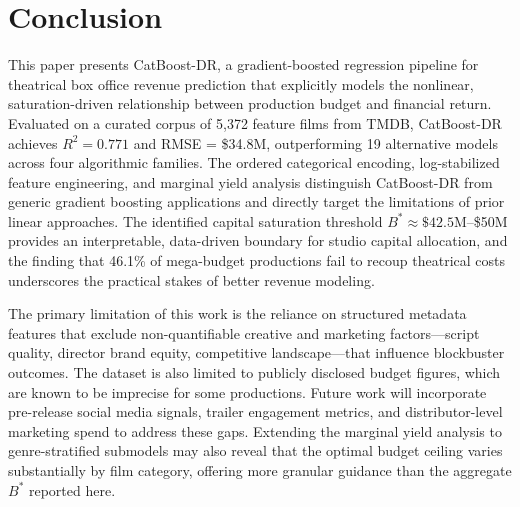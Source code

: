 \documentclass[journal]{IEEEtran}
\begin{document}
\section{Conclusion}
\label{sec:conclusion}

This paper presents CatBoost-DR, a gradient-boosted regression pipeline for theatrical box office revenue prediction that explicitly models the nonlinear, saturation-driven relationship between production budget and financial return. Evaluated on a curated corpus of 5,372 feature films from TMDB, CatBoost-DR achieves \(R^2 = 0.771\) and RMSE = \$34.8M, outperforming 19 alternative models across four algorithmic families. The ordered categorical encoding, log-stabilized feature engineering, and marginal yield analysis distinguish CatBoost-DR from generic gradient boosting applications and directly target the limitations of prior linear approaches. The identified capital saturation threshold \(B^* \approx \$42.5\text{M}\)–\$50M provides an interpretable, data-driven boundary for studio capital allocation, and the finding that 46.1\% of mega-budget productions fail to recoup theatrical costs underscores the practical stakes of better revenue modeling.

The primary limitation of this work is the reliance on structured metadata features that exclude non-quantifiable creative and marketing factors—script quality, director brand equity, competitive landscape—that influence blockbuster outcomes. The dataset is also limited to publicly disclosed budget figures, which are known to be imprecise for some productions. Future work will incorporate pre-release social media signals, trailer engagement metrics, and distributor-level marketing spend to address these gaps. Extending the marginal yield analysis to genre-stratified submodels may also reveal that the optimal budget ceiling varies substantially by film category, offering more granular guidance than the aggregate \(B^*\) reported here.

\balance



\end{document}
